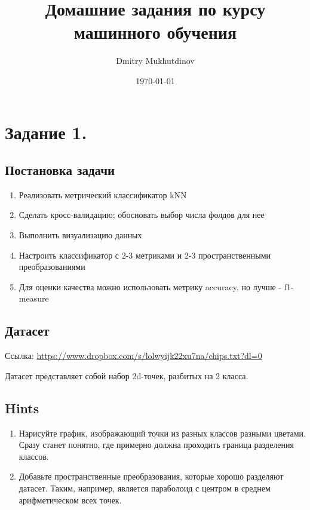 \documentclass[a4paper, unicode]{article}
\author{Dmitry Mukhutdinov}
\date{\today}
\title{Домашние задания по курсу машинного обучения}
\begin{document}
\maketitle
\tableofcontents


\section{Задание 1.}
\label{sec:orgheadline6}
\subsection{Постановка задачи}
\label{sec:orgheadline1}
\begin{enumerate}
\item Реализовать метрический классификатор kNN
\item Сделать кросс-валидацию; обосновать выбор числа фолдов для нее
\item Выполнить визуализацию данных
\item Настроить классификатор с 2-3 метриками и 2-3 пространственными преобразованиями
\item Для оценки качества можно использовать метрику accuracy, но лучше - f1-measure
\end{enumerate}
\subsection{Датасет}
\label{sec:orgheadline2}
Ссылка: \url{https://www.dropbox.com/s/lolwyijk22xu7na/chips.txt?dl=0}

Датасет представляет собой набор 2d-точек, разбитых на 2 класса.
\subsection{Hints}
\label{sec:orgheadline3}
\begin{enumerate}
\item Нарисуйте график, изображающий точки из разных классов разными цветами. Сразу
станет понятно, где примерно должна проходить граница разделения классов.
\item Добавьте пространственные преобразования, которые хорошо разделяют датасет.
Таким, например, является параболоид с центром в среднем арифметическом всех точек.
\end{enumerate}
\end{document}
